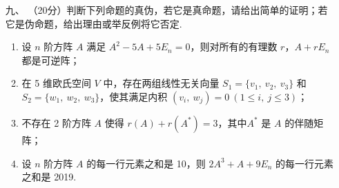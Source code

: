 \begin{enumerate}
    \item[九、]（20分）判断下列命题的真伪，若它是真命题，请给出简单的证明；若它是伪命题，给出理由或举反例将它否定.
    \begin{enumerate}[label=(\arabic*)]
        \item 设 $n$ 阶方阵 $A$ 满足 $A^2-5A+5E_n=0$，则对所有的有理数 $r$，$A+rE_n$ 都是可逆阵；

        \item 在 5 维欧氏空间 $V$ 中，存在两组线性无关向量 $S_1=\{v_1,\ v_2,\ v_3\}$ 和 $S_2=\{w_1,\ w_2,\ w_3\}$，使其满足内积 $(v_i,\ w_j)=0\ (1 \leq i,\ j \leq 3)$；

        \item 不存在 2 阶方阵 $A$ 使得 $r(A)+r(A^*)=3$，其中$A^*$ 是 $A$ 的伴随矩阵；

        \item 设 $n$ 阶方阵 $A$ 的每一行元素之和是 10，则 $2A^3+A+9E_n$ 的每一行元素之和是 2019.
    \end{enumerate}
\end{enumerate}

\clearpage
